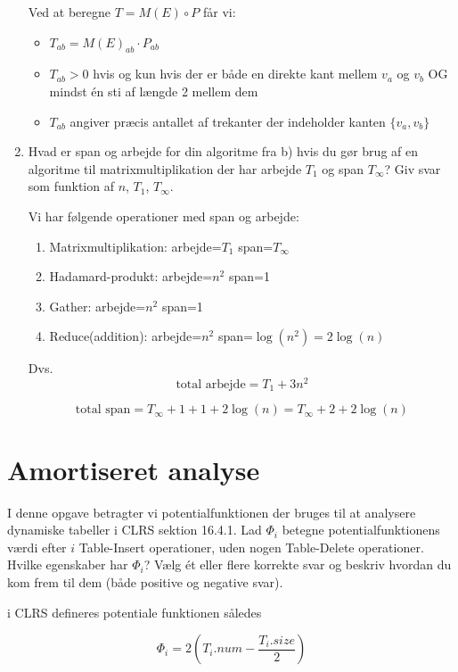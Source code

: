 \documentclass{article}
\theoremstyle{definition}
\begin{document}
\begin{enumerate}[label=\alph*)]
Ved at beregne $T = M(E) \circ P$ får vi:
\begin{itemize}
\item $T_{ab} = M(E)_{ab} \cdot P_{ab}$
\item $T_{ab} > 0$ hvis og kun hvis der er både en direkte kant mellem $v_a$ og $v_b$ OG mindst én sti af længde 2 mellem dem
\item $T_{ab}$ angiver præcis antallet af trekanter der indeholder kanten $\{v_a, v_b\}$
\end{itemize}

\item Hvad er span og arbejde for din algoritme fra b) hvis du gør brug af en algoritme til matrixmultiplikation der har arbejde $T_1$ og span $T_\infty$? Giv svar som funktion af $n$, $T_1$, $T_\infty$.

Vi har følgende operationer med span og arbejde:

\begin{enumerate}
    \item Matrixmultiplikation: arbejde=$T_1$ span=$T_\infty$
    \item Hadamard-produkt: arbejde=$n^2$ span=1
    \item Gather: arbejde=$n^2$ span=1
    \item Reduce(addition): arbejde=$n^2$ span=$\log(n^2)=2\log(n)$
\end{enumerate}

Dvs. 
\[
\text{total arbejde} = T_1 + 3n^2
\]

\[
\text{total span} = T_\infty + 1 + 1 + 2\log(n) = T_\infty + 2 + 2\log(n)
\]

\end{enumerate}

\section{Amortiseret analyse}

I denne opgave betragter vi potentialfunktionen der bruges til at analysere dynamiske tabeller i CLRS sektion 16.4.1. Lad $\Phi_i$ betegne potentialfunktionens værdi efter $i$ Table-Insert operationer, uden nogen Table-Delete operationer. Hvilke egenskaber har $\Phi_i$? Vælg ét eller flere korrekte svar og beskriv hvordan du kom frem til dem (både positive og negative svar).

i CLRS defineres potentiale funktionen således

\[
\Phi_i = 2(T_i.num - \frac{T_i.size}{2})
\]
\end{document}
